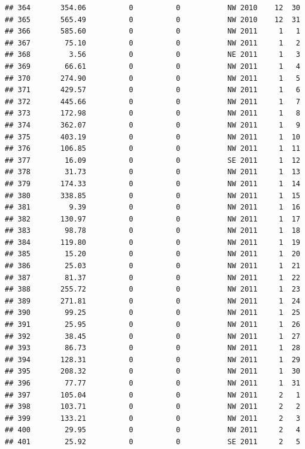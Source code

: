 \documentclass[
]{article}
\begin{document}
\begin{verbatim}
## 364       354.06          0          0           NW 2010    12  30
## 365       565.49          0          0           NW 2010    12  31
## 366       585.60          0          0           NW 2011     1   1
## 367        75.10          0          0           NW 2011     1   2
## 368         3.56          0          0           NE 2011     1   3
## 369        66.61          0          0           NW 2011     1   4
## 370       274.90          0          0           NW 2011     1   5
## 371       429.57          0          0           NW 2011     1   6
## 372       445.66          0          0           NW 2011     1   7
## 373       172.98          0          0           NW 2011     1   8
## 374       362.07          0          0           NW 2011     1   9
## 375       403.19          0          0           NW 2011     1  10
## 376       106.85          0          0           NW 2011     1  11
## 377        16.09          0          0           SE 2011     1  12
## 378        31.73          0          0           NW 2011     1  13
## 379       174.33          0          0           NW 2011     1  14
## 380       338.85          0          0           NW 2011     1  15
## 381         9.39          0          0           NW 2011     1  16
## 382       130.97          0          0           NW 2011     1  17
## 383        98.78          0          0           NW 2011     1  18
## 384       119.80          0          0           NW 2011     1  19
## 385        15.20          0          0           NW 2011     1  20
## 386        25.03          0          0           NW 2011     1  21
## 387        81.37          0          0           NW 2011     1  22
## 388       255.72          0          0           NW 2011     1  23
## 389       271.81          0          0           NW 2011     1  24
## 390        99.25          0          0           NW 2011     1  25
## 391        25.95          0          0           NW 2011     1  26
## 392        38.45          0          0           NW 2011     1  27
## 393        86.73          0          0           NW 2011     1  28
## 394       128.31          0          0           NW 2011     1  29
## 395       208.32          0          0           NW 2011     1  30
## 396        77.77          0          0           NW 2011     1  31
## 397       105.04          0          0           NW 2011     2   1
## 398       103.71          0          0           NW 2011     2   2
## 399       133.21          0          0           NW 2011     2   3
## 400        29.95          0          0           NW 2011     2   4
## 401        25.92          0          0           SE 2011     2   5

\end{verbatim}
\end{document}
